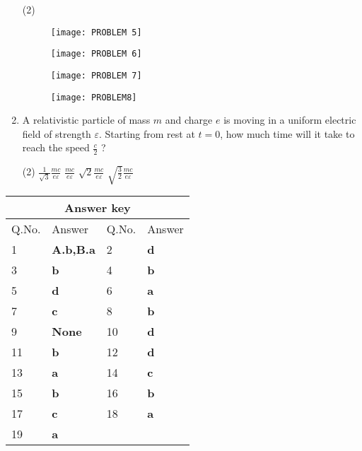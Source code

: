 \begin{enumerate}
	{}
\begin{tasks}(2)
	\task[\textbf{A.}]\begin{figure}[H]
		\centering
		\texttt{[image: PROBLEM 5]}
	\end{figure}
	\task[\textbf{B.}]\begin{figure}[H]
		\centering
		\texttt{[image: PROBLEM 6]}
	\end{figure}
	\task[\textbf{C.}]\begin{figure}[H]
		\centering
		\texttt{[image: PROBLEM 7]}
	\end{figure}
	\task[\textbf{D.}]\begin{figure}[H]
		\centering
		\texttt{[image: PROBLEM8]}
	\end{figure}
\end{tasks}
	\item A relativistic particle of mass $m$ and charge $e$ is moving in a uniform electric field of strength $\varepsilon$. Starting from rest at $t=0$, how much time will it take to reach the speed $\frac{c}{2}$ ?
	{}
\begin{tasks}(2)
	\task[\textbf{A.}] $\frac{1}{\sqrt{3}} \frac{m c}{e \varepsilon}$
	\task[\textbf{B.}]$\frac{m c}{e \varepsilon}$
	\task[\textbf{C.}]$\sqrt{2} \frac{m c}{e \varepsilon}$
	\task[\textbf{D.}]$\sqrt{\frac{3}{2}} \frac{m c}{e \varepsilon}$
\end{tasks}
\end{enumerate}
\setlength\arrayrulewidth{1pt}
\begin{table}[H]
	\centering
	
	\begin{tabular}{|p{1.5cm}|p{1.5cm}||p{1.5cm}|p{1.5cm}|}
		\hline
		\multicolumn{4}{|c|}{\textbf{Answer key}}\\\hline\hline
		\rowcolor{ocrel}Q.No.&Answer&Q.No.&Answer\\\hline
		1&\textbf{A.b,B.a}&2&\textbf{d}\\\hline
		3&\textbf{b}&4&\textbf{b}\\\hline
		5&\textbf{d}&6&\textbf{a}\\\hline
		7&\textbf{c}&8&\textbf{b}\\\hline
		9&\textbf{None}&10&\textbf{d}\\\hline
		11&\textbf{b}&12&\textbf{d}\\\hline
		13&\textbf{a}&14&\textbf{c}\\\hline
		15&\textbf{b}&16&\textbf{b}\\\hline
		17&\textbf{c}&18&\textbf{a}\\\hline
		19&\textbf{a}&&\\\hline
	\end{tabular}
\end{table}
